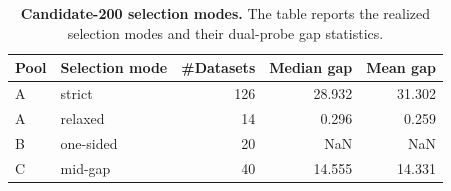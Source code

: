 \begin{table}
\caption{\textbf{Candidate-200 selection modes.} The table reports the realized selection modes and their dual-probe gap statistics.}
\label{tab:table03_candidate200_selection_modes}
\begin{tabular}{llrrr}
\toprule
\textbf{Pool} & \textbf{Selection mode} & \textbf{\#Datasets} & \textbf{Median gap} & \textbf{Mean gap} \\
\midrule
A & strict & 126 & 28.932 & 31.302 \\
A & relaxed & 14 & 0.296 & 0.259 \\
B & one-sided & 20 & NaN & NaN \\
C & mid-gap & 40 & 14.555 & 14.331 \\
\bottomrule
\end{tabular}
\end{table}
